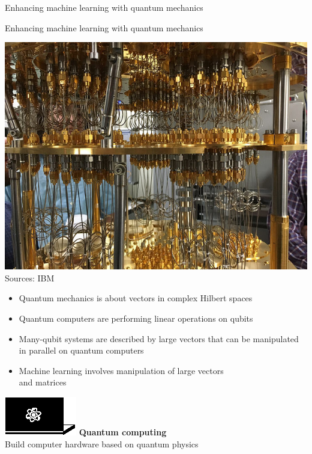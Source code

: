 \documentclass[10pt]{beamer}
\begin{document}
{\begin{frame}[fragile]{Enhancing machine learning with quantum mechanics}
\end{frame}
}

{
\begin{frame}[fragile]{Enhancing machine learning with quantum mechanics}
\hspace{-0.7cm}
\begin{minipage}[c]{0.59\textwidth}
\centering
\includegraphics[scale=0.16]{ibm-quantum-computer.jpg}\\
\tiny{Sources: IBM}
\vspace{0.1cm}
\flushleft
\normalsize
\begin{itemize}
\item Quantum mechanics is about vectors in complex Hilbert spaces
\item Quantum computers are performing linear operations on qubits
\item Many-qubit systems are described by large vectors that can be manipulated in parallel on quantum computers
\item Machine learning involves manipulation of large vectors\\ and matrices
\end{itemize}
\end{minipage}%
\hspace{0.3cm}
\begin{minipage}[c]{0.39\textwidth}
\vspace{2.8cm}
\centering
\hspace{-1cm}\includegraphics[scale=2.2]{Vectors/laptop_q.eps}
\flushleft
\textbf{Quantum computing}\\
Build computer hardware based on quantum physics
\end{minipage}

\end{frame}
}
\end{document}
